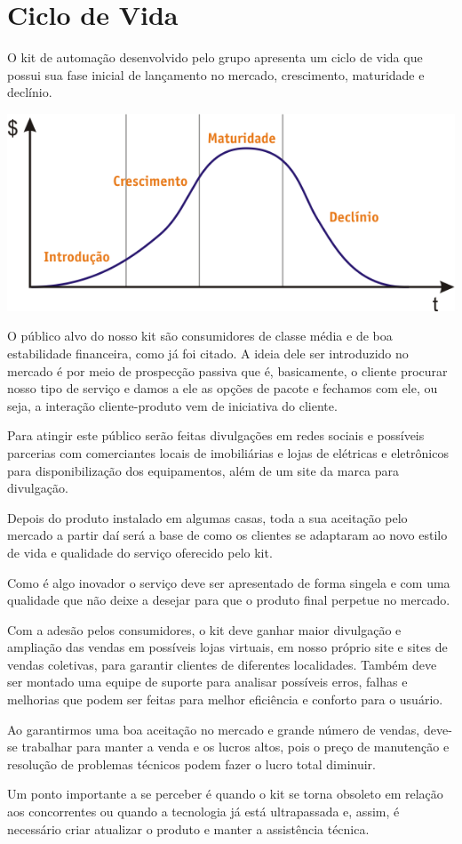 \chapter{Ciclo de Vida}
\par O kit de automação desenvolvido pelo grupo apresenta um ciclo de vida que possui sua fase inicial de lançamento no mercado, crescimento, maturidade e declínio.

\begin{center}
\includegraphics[width=\textwidth]{figuras/ciclodevida}
\end{center}

\par O público alvo do nosso kit são consumidores de classe média e de boa estabilidade financeira, como já foi citado. A ideia dele ser introduzido no mercado é por meio de prospecção passiva que é, basicamente, o cliente procurar nosso tipo de serviço e damos a ele as opções de pacote e fechamos com ele, ou seja, a interação cliente-produto vem de iniciativa do cliente.
\par Para atingir este público serão feitas divulgações em redes sociais e possíveis parcerias com comerciantes locais de imobiliárias e lojas de elétricas e eletrônicos para disponibilização dos equipamentos, além de um site da marca para divulgação.
\par Depois do produto instalado em algumas casas, toda a sua aceitação pelo mercado a partir daí será a base de como os clientes se adaptaram ao novo estilo de vida e qualidade do serviço oferecido pelo kit.
\par Como é algo inovador o serviço deve ser apresentado de forma singela e com uma qualidade que não deixe a desejar para que o produto final perpetue no mercado.
\par Com a adesão pelos consumidores, o kit deve ganhar maior divulgação e ampliação das vendas em possíveis lojas virtuais, em nosso próprio site e sites de vendas coletivas, para garantir clientes de diferentes localidades. Também deve ser montado uma equipe de suporte para analisar possíveis erros, falhas e melhorias que podem ser feitas para melhor eficiência e conforto para o usuário.
\par Ao garantirmos uma boa aceitação no mercado e grande número de vendas, deve-se trabalhar para manter a venda e os lucros altos, pois o preço de manutenção e resolução de problemas técnicos podem fazer o lucro total diminuir.
\par Um ponto importante a se perceber é quando o kit se torna obsoleto em relação aos concorrentes ou quando a tecnologia já está ultrapassada e, assim, é necessário criar atualizar o produto e manter a assistência técnica.
